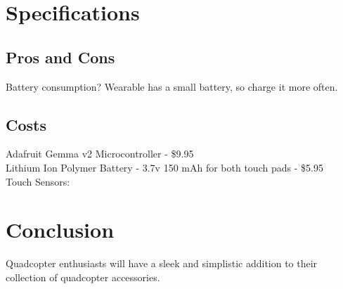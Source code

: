 \documentclass[12pt,letterpaper]{article}
\begin{document}
\section*{Specifications}
\subsection*{Pros and Cons}
Battery consumption?
Wearable has a small battery, so charge it more often.
\subsection*{Costs}
Adafruit Gemma v2 Microcontroller - \$9.95 \\
Lithium Ion Polymer Battery - 3.7v 150 mAh for both touch pads - \$5.95 \\
Touch Sensors: \\



\section*{Conclusion}
Quadcopter enthusiasts will have a sleek and simplistic addition to their collection of quadcopter accessories. 

\newpage
\nocite{*}


\end{document}
